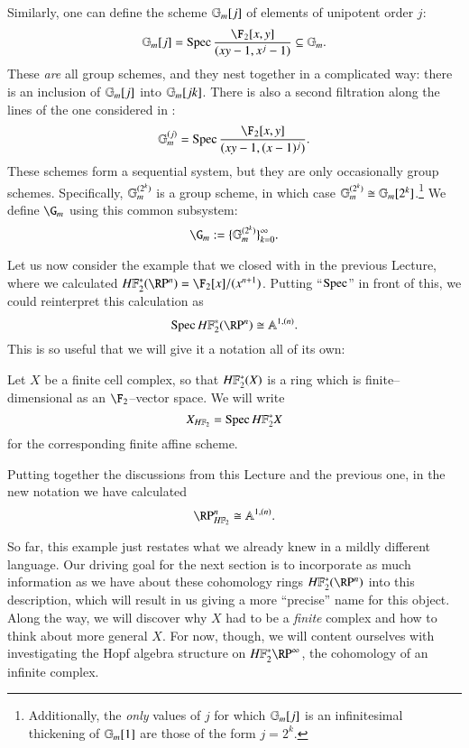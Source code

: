 \begin{example}
Similarly, one can define the scheme $\mathbb G_m[j]$ of elements of unipotent order $j$: \[\Gm[j] = \Spec \frac{\F_2[x,y]}{(xy - 1, x^j - 1)} \subseteq \Gm.\]  These \emph{are} all group schemes, and they nest together in a complicated way: there is an inclusion of $\mathbb G_m[j]$ into $\mathbb G_m[jk]$.  There is also a second filtration along the lines of the one considered in : \[\Gm^{(j)} = \Spec \frac{\F_2[x,y]}{(xy - 1, (x - 1)^j)}.\]  These schemes form a sequential system, but they are only occasionally group schemes.  Specifically, $\mathbb G_m^{(2^k)}$ is a group scheme, in which case $\mathbb G_m^{(2^k)} \cong \mathbb G_m[2^k]$.\footnote{Additionally, the \emph{only} values of $j$ for which $\mathbb G_m[j]$ is an infinitesimal thickening of $\mathbb G_m[1]$ are those of the form $j = 2^k$.}  We define $\G_m$ using this common subsystem: \[\G_m := \{\Gm^{(2^k)}\}_{k=0}^\infty.\]
\end{example}

Let us now consider the example that we closed with in the previous Lecture, where we calculated $\HFtwo^*(\RP^n) = \F_2[x] / (x^{n+1})$.  Putting ``$\operatorname{Spec}$'' in front of this, we could reinterpret this calculation as \[\Spec \HFtwo^*(\RP^n) \cong \mathbb A^{1, (n)}.\]  This is so useful that we will give it a notation all of its own:

\begin{definition}\label{HF2SchemeForFiniteCplx}
Let $X$ be a finite cell complex, so that $\HFtwo^*(X)$ is a ring which is finite--dimensional as an $\F_2$--vector space.  We will write \[X_{\HFtwo} = \Spec \HFtwo^* X\] for the corresponding finite affine scheme.
\end{definition}

\begin{example}
Putting together the discussions from this Lecture and the previous one, in the new notation we have calculated \[\RP^n_{\HFtwo} \cong \mathbb A^{1, (n)}.\]
\end{example}

So far, this example just restates what we already knew in a mildly different language.  Our driving goal for the next section is to incorporate as much information as we have about these cohomology rings $\HFtwo^* (\RP^n)$ into this description, which will result in us giving a more ``precise'' name for this object.  Along the way, we will discover why $X$ had to be a \emph{finite} complex and how to think about more general $X$.  For now, though, we will content ourselves with investigating the Hopf algebra structure on $\HFtwo^* \RP^\infty$, the cohomology of an infinite complex.

